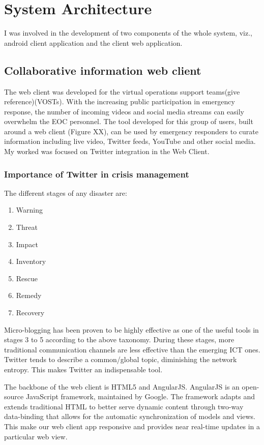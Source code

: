 \section{System Architecture}
I was involved in the development of two components of the whole system, viz., android client application and the client web application.



\subsection{Collaborative information web client}
The web client was developed for the virtual operations support teams(give reference)(VOSTs). With the increasing public participation in emergency response, the number of incoming videos and social media streams can easily overwhelm the EOC personnel. The tool developed for this group of users, built around a web client (Figure XX), can be used by emergency responders to curate information including live video, Twitter feeds, YouTube and other social media.  My worked was focused on Twitter integration in the Web Client.

\subsubsection{Importance of Twitter in crisis management}
The different stages of any disaster are: 

\begin{enumerate}
\item Warning
\item Threat
\item Impact
\item Inventory
\item Rescue
\item Remedy
\item Recovery
\end{enumerate}
Micro-blogging has been proven to be highly effective as one of the useful tools in stages 3 to 5 according to the above taxonomy. During these stages, more traditional communication channels are less effective than the emerging ICT ones. Twitter tends to describe a common/global topic, diminishing the network entropy. This makes Twitter an indispensable tool.

The backbone of the web client is HTML5 and AngularJS. AngularJS is an open-source JavaScript framework, maintained by Google. The framework adapts and extends traditional HTML to better serve dynamic content through two-way data-binding that allows for the automatic synchronization of models and views. This make our web client app responsive and provides near real-time updates in a particular web view. 

